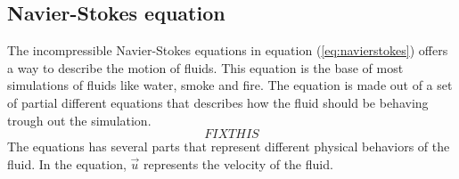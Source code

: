 \subsection{Navier-Stokes equation}
The incompressible Navier-Stokes equations in equation (\ref{eq:navierstokes}) offers a way to describe the motion of fluids. 
This equation is the base of most simulations of fluids like water, smoke and fire. 
The equation is made out of a set of partial different equations that describes how the fluid should be behaving trough out the simulation.
\begin{equation}
  \label{eq:navierstokes}
  FIX THIS
\end{equation}
The equations has several parts that represent different physical behaviors of the fluid. 
In the equation, $\vec{u}$ represents the velocity of the fluid.

